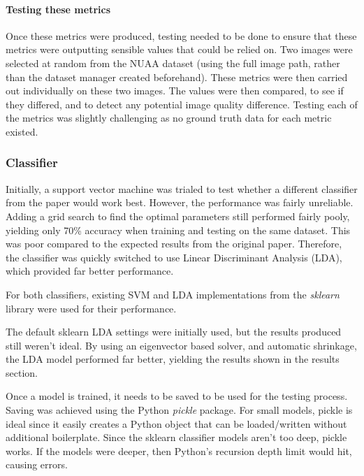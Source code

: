 \documentclass[11pt,a4paper]{article}
\begin{document}
            \paragraph{Testing these metrics}
            Once these metrics were produced, testing needed to be done to ensure that these metrics were outputting sensible values that could be relied on.
            Two images were selected at random from the NUAA dataset (using the full image path, rather than the dataset manager created beforehand). These metrics
            were then carried out individually on these two images. The values were then compared, to see if they differed, and to detect any potential image quality difference. 
            Testing each of the metrics was slightly challenging as no ground truth data for each metric existed.


        \subsubsection{Classifier}
            Initially, a support vector machine was trialed to test whether a different classifier from the paper \cite{ImageQualityAssessmentTest} would work best. However,
            the performance was fairly unreliable. Adding a grid search to find the optimal parameters still performed fairly pooly, yielding only 70\% accuracy when training and testing on the same dataset. This was poor compared to the expected results from the original paper. Therefore, the classifier was quickly switched to
            use Linear Discriminant Analysis (LDA), which provided far better performance.

            For both classifiers, existing SVM and LDA implementations from the \emph{sklearn} library were used for their performance. 
            
            The default sklearn LDA settings were initially used, but the results produced still weren't ideal. By using an eigenvector based solver, and automatic shrinkage, the LDA model performed far better, yielding the results
            shown in the results section.

            Once a model is trained, it needs to be saved to be used for the testing process. Saving was achieved using the Python \emph{pickle} package. For small models, pickle is ideal since it easily creates a Python object that can be loaded/written
            without additional boilerplate. Since the sklearn classifier models aren't too deep, pickle works. If the models were deeper, then Python's recursion depth limit would hit, causing errors. 
     
\end{document}
